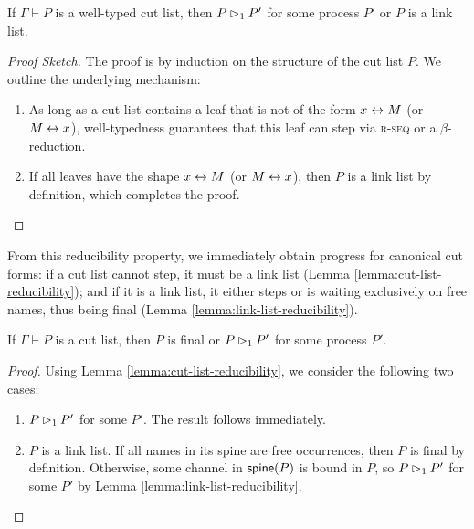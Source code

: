 \begin{lemma} \label{lemma:cut-list-reducibility}
  If $\Gamma \vdash P$ is a well-typed cut list,
  then $P \rhd_1 P'$ for some process $P'$ or $P$ is a link list.
\end{lemma}
\begin{proof}[Proof Sketch]
  The proof is by induction on the structure of the cut list $P$.
  We outline the underlying mechanism:
  \begin{enumerate}
    \item As long as a cut list contains a leaf that is not of the form $x \leftrightarrow M$ (or $M \leftrightarrow x$),
          well-typedness guarantees that this leaf can step via \textsc{r-seq} or
          a $\beta$-reduction.

    \item If all leaves have the shape $x \leftrightarrow M$ (or $M \leftrightarrow x$), then $P$ is a link
          list by definition, which completes the proof.

          \qedhere
  \end{enumerate}
\end{proof}

From this reducibility property, we immediately obtain progress for canonical cut forms:
if a cut list cannot step, it must be a link list (Lemma \ref{lemma:cut-list-reducibility}); and if it is a link list,
it either steps or is waiting exclusively on free names, thus being final
(Lemma \ref{lemma:link-list-reducibility}).

\begin{corollary} \label{cor:progress-for-cut-list}
  If $\Gamma \vdash P$ is a cut list, then $P$ is final
  or $P \rhd_1 P'$ for some process $P'$.
\end{corollary}
\begin{proof}
  Using Lemma \ref{lemma:cut-list-reducibility}, we consider the following two cases:
  \begin{enumerate}[label=(\roman*)]
    \item $P \rhd_1 P'$ for some $P'$. The result follows immediately.
    \item $P$ is a link list. If all names in its spine are free occurrences,
          then $P$ is final by definition. Otherwise, some channel in $\mathsf{spine}(P)$
          is bound in $P$, so $P \rhd_1 P'$ for some $P'$
          by Lemma \ref{lemma:link-list-reducibility}.
  \end{enumerate}
\end{proof}

